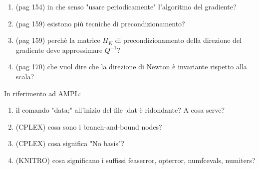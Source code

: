 \begin{enumerate}
	\item (pag 154) in che senso "usare periodicamente" l'algoritmo del gradiente?

	\item (pag 159) esistono più tecniche di precondizionamento?

	\item (pag 159) perchè la matrice $H_{K}$ di precondizionamento della direzione del gradiente deve approssimare $Q^{-1}$?

  \item (pag 170) che vuol dire che la direzione di Newton è invariante rispetto alla scala?

\end{enumerate}

In riferimento ad AMPL:

\begin{enumerate}

	\item il comando "data;" all'inizio del file .dat è ridondante? A cosa serve?

	\item (CPLEX) cosa sono i branch-and-bound nodes?

	\item (CPLEX) cosa significa "No basis"?

	\item (KNITRO) cosa significano i suffissi feaserror, opterror, numfcevals, numiters?

\end{enumerate}

\clearpage
